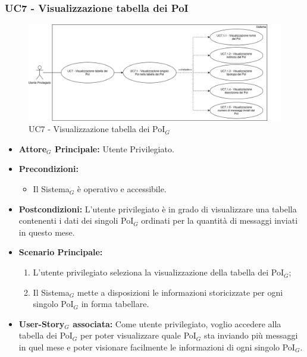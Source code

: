 \documentclass[10pt]{article}
\begin{document}
\begin{justify}
\subsubsection{\textbf{UC7 - Visualizzazione tabella dei PoI}}
\begin{figure}[H]
    \centering
    \includegraphics[width=0.7\linewidth]{UC7image.png}
    \caption{UC7 - Visualizzazione tabella dei PoI$_G$}
    \label{fig:UC7}
\end{figure}
\label{UC7}
\begin{itemize}
    \item \textbf{Attore$_G$ Principale:} Utente Privilegiato.
    \item \textbf{Precondizioni:} 
        \begin{itemize}
          \item Il Sistema$_G$ è operativo e accessibile.
        \end{itemize}
      \item \textbf{Postcondizioni:} L'utente privilegiato è in grado di visualizzare una tabella contenenti i dati dei singoli PoI$_G$ ordinati per la quantità di messaggi inviati in questo mese.\\
    \item \textbf{Scenario Principale:} 
        \begin{enumerate}
        \item L'utente privilegiato seleziona la visualizzazione della tabella dei PoI$_G$;
          \item Il Sistema$_G$ mette a disposizioni le informazioni storicizzate per ogni singolo PoI$_G$ in forma tabellare.
        \end{enumerate}
    \item \textbf{User-Story$_G$ associata:} Come utente privilegiato, voglio accedere alla tabella dei PoI$_G$ per poter visualizzare quale PoI$_G$ sta inviando più messaggi in quel mese e poter visionare facilmente le informazioni di ogni singolo PoI$_G$.
\end{itemize}


\end{justify}
\end{document}
